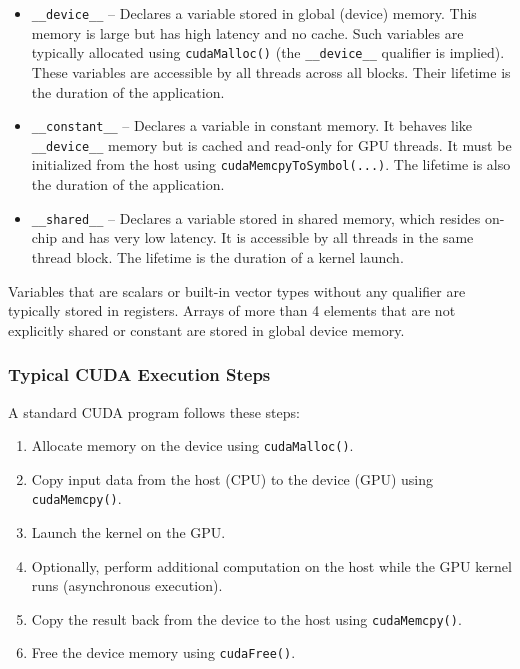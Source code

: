 \documentclass[12pt]{book}
\begin{document}
\begin{itemize}
    \item \texttt{\_\_device\_\_} – Declares a variable stored in global (device) memory. This memory is large but has high latency and no cache. Such variables are typically allocated using \texttt{cudaMalloc()} (the \texttt{\_\_device\_\_} qualifier is implied). These variables are accessible by all threads across all blocks. Their lifetime is the duration of the application.
    
    \item \texttt{\_\_constant\_\_} – Declares a variable in constant memory. It behaves like \texttt{\_\_device\_\_} memory but is cached and read-only for GPU threads. It must be initialized from the host using \texttt{cudaMemcpyToSymbol(...)}. The lifetime is also the duration of the application.
    
    \item \texttt{\_\_shared\_\_} – Declares a variable stored in shared memory, which resides on-chip and has very low latency. It is accessible by all threads in the same thread block. The lifetime is the duration of a kernel launch.
\end{itemize}

Variables that are scalars or built-in vector types without any qualifier are typically stored in registers. Arrays of more than 4 elements that are not explicitly shared or constant are stored in global device memory.

\subsubsection*{Typical CUDA Execution Steps}
A standard CUDA program follows these steps:

\begin{enumerate}
    \item Allocate memory on the device using \texttt{cudaMalloc()}.
    \item Copy input data from the host (CPU) to the device (GPU) using \texttt{cudaMemcpy()}.
    \item Launch the kernel on the GPU.
    \item Optionally, perform additional computation on the host while the GPU kernel runs (asynchronous execution).
    \item Copy the result back from the device to the host using \texttt{cudaMemcpy()}.
    \item Free the device memory using \texttt{cudaFree()}.
\end{enumerate}
\end{document}
